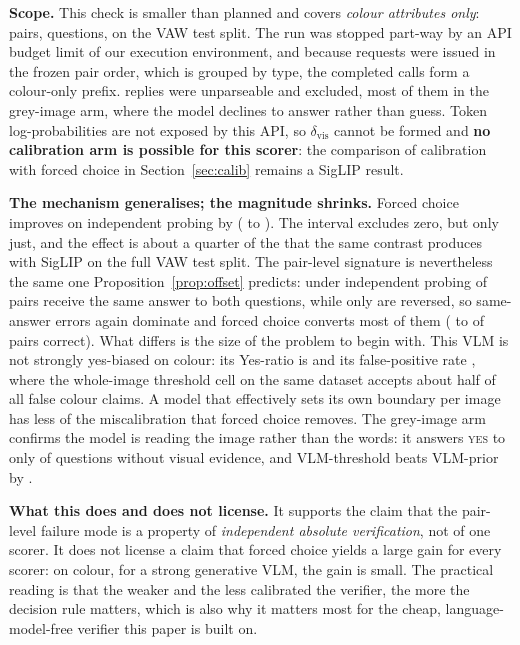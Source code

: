 \documentclass[11pt]{article}
\newcommand{\yes}{\textsc{yes}}
\begin{document}
\textbf{Scope.} This check is smaller than planned and covers \emph{colour attributes only}: \VLMpairs{} pairs, \VLMquestions{} questions, on the VAW test split. The run was stopped part-way by an API budget limit of our execution environment, and because requests were issued in the frozen pair order, which is grouped by type, the completed calls form a colour-only prefix. \VLMdropped{} replies were unparseable and excluded, most of them in the grey-image arm, where the model declines to answer rather than guess. Token log-probabilities are not exposed by this API, so $\delta_{\mathrm{vis}}$ cannot be formed and \textbf{no calibration arm is possible for this scorer}: the comparison of calibration with forced choice in Section~\ref{sec:calib} remains a SigLIP result.

\textbf{The mechanism generalises; the magnitude shrinks.} Forced choice improves on independent probing by \VLMfcMinusThr{} \VLMfcMinusThrCI{} (\VLMaccThr{} to \VLMaccFC). The interval excludes zero, but only just, and the effect is about a quarter of the \VAWtestBminusA{} that the same contrast produces with SigLIP on the full VAW test split. The pair-level signature is nevertheless the same one Proposition~\ref{prop:offset} predicts: under independent probing \VLMpairSame{} of pairs receive the same answer to both questions, while only \VLMpairRev{} are reversed, so same-answer errors again dominate and forced choice converts most of them (\VLMpairCorrect{} to \VLMfcCorrect{} of pairs correct). What differs is the size of the problem to begin with. This VLM is not strongly yes-biased on colour: its Yes-ratio is \VLMyesThr{} and its false-positive rate \VLMfprThr, where the whole-image threshold cell on the same dataset accepts about half of all false colour claims. A model that effectively sets its own boundary per image has less of the miscalibration that forced choice removes. The grey-image arm confirms the model is reading the image rather than the words: it answers \yes{} to only \VLMyesPrior{} of questions without visual evidence, and VLM-threshold beats VLM-prior by \VLMthrMinusPrior{} \VLMthrMinusPriorCI.

\textbf{What this does and does not license.} It supports the claim that the pair-level failure mode is a property of \emph{independent absolute verification}, not of one scorer. It does not license a claim that forced choice yields a large gain for every scorer: on colour, for a strong generative VLM, the gain is small. The practical reading is that the weaker and the less calibrated the verifier, the more the decision rule matters, which is also why it matters most for the cheap, language-model-free verifier this paper is built on.
\end{document}
